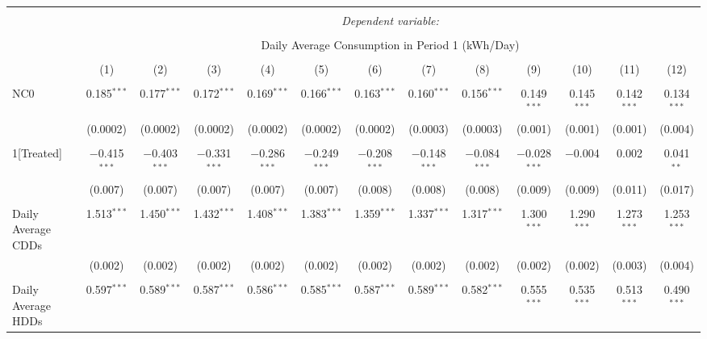 
\begin{table}[!htbp] \centering 
  \caption{} 
  \label{} 
\small 
\begin{tabular}{@{\extracolsep{5pt}}lcccccccccccc} 
\\[-1.8ex]\hline 
\hline \\[-1.8ex] 
 & \multicolumn{12}{c}{\textit{Dependent variable:}} \\ 
\cline{2-13} 
\\[-1.8ex] & \multicolumn{12}{c}{Daily Average Consumption in Period 1 (kWh/Day)} \\ 
\\[-1.8ex] & (1) & (2) & (3) & (4) & (5) & (6) & (7) & (8) & (9) & (10) & (11) & (12)\\ 
\hline \\[-1.8ex] 
 NC0 & 0.185$^{***}$ & 0.177$^{***}$ & 0.172$^{***}$ & 0.169$^{***}$ & 0.166$^{***}$ & 0.163$^{***}$ & 0.160$^{***}$ & 0.156$^{***}$ & 0.149$^{***}$ & 0.145$^{***}$ & 0.142$^{***}$ & 0.134$^{***}$ \\ 
  & (0.0002) & (0.0002) & (0.0002) & (0.0002) & (0.0002) & (0.0002) & (0.0003) & (0.0003) & (0.001) & (0.001) & (0.001) & (0.004) \\ 
  & & & & & & & & & & & & \\ 
 1[Treated] & $-$0.415$^{***}$ & $-$0.403$^{***}$ & $-$0.331$^{***}$ & $-$0.286$^{***}$ & $-$0.249$^{***}$ & $-$0.208$^{***}$ & $-$0.148$^{***}$ & $-$0.084$^{***}$ & $-$0.028$^{***}$ & $-$0.004 & 0.002 & 0.041$^{**}$ \\ 
  & (0.007) & (0.007) & (0.007) & (0.007) & (0.007) & (0.008) & (0.008) & (0.008) & (0.009) & (0.009) & (0.011) & (0.017) \\ 
  & & & & & & & & & & & & \\ 
 Daily Average CDDs & 1.513$^{***}$ & 1.450$^{***}$ & 1.432$^{***}$ & 1.408$^{***}$ & 1.383$^{***}$ & 1.359$^{***}$ & 1.337$^{***}$ & 1.317$^{***}$ & 1.300$^{***}$ & 1.290$^{***}$ & 1.273$^{***}$ & 1.253$^{***}$ \\ 
  & (0.002) & (0.002) & (0.002) & (0.002) & (0.002) & (0.002) & (0.002) & (0.002) & (0.002) & (0.002) & (0.003) & (0.004) \\ 
  & & & & & & & & & & & & \\ 
 Daily Average HDDs & 0.597$^{***}$ & 0.589$^{***}$ & 0.587$^{***}$ & 0.586$^{***}$ & 0.585$^{***}$ & 0.587$^{***}$ & 0.589$^{***}$ & 0.582$^{***}$ & 0.555$^{***}$ & 0.535$^{***}$ & 0.513$^{***}$ & 0.490$^{***}$ \\ 

\end{tabular}
\end{table}

